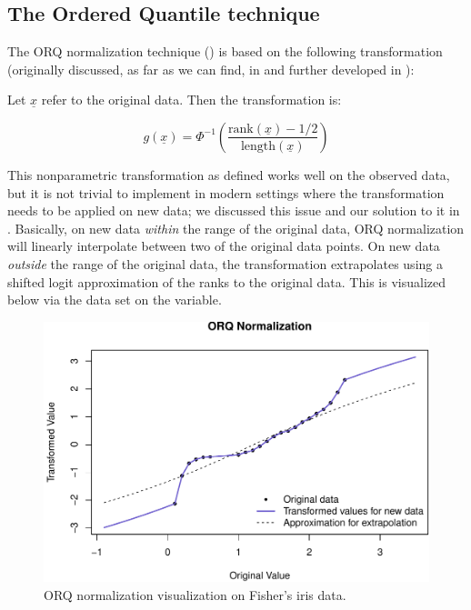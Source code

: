 \hypertarget{the-ordered-quantile-technique}{%
\subsection{The Ordered Quantile
technique}\label{the-ordered-quantile-technique}}

The ORQ normalization technique () is based on the
following transformation (originally discussed, as far as we can find,
in \citet{bartlett1947} and further developed in \citet{van1952}):

Let \(\underline x\) refer to the original data. Then the transformation
is:

\[
g(\underline x) = \Phi ^{-1} \left(\frac{\text{rank} (\underline x) - 1/2}{\text{length}(\underline x) }\right)
\]

This nonparametric transformation as defined works well on the observed
data, but it is not trivial to implement in modern settings where the
transformation needs to be applied on new data; we discussed this issue
and our solution to it in \citet{orq_paper}. Basically, on new data
\emph{within} the range of the original data, ORQ normalization will
linearly interpolate between two of the original data points. On new
data \emph{outside} the range of the original data, the transformation
extrapolates using a shifted logit approximation of the ranks to the
original data. This is visualized below via the  data set on
the  variable.

\begin{Schunk}
\begin{figure}

{\centering \includegraphics[width=1\linewidth]{figs/orqvis-1} 

}

\caption[ORQ normalization visualization on Fisher's iris data]{ORQ normalization visualization on Fisher's iris data.}\label{fig:orqvis}
\end{figure}
\end{Schunk}

